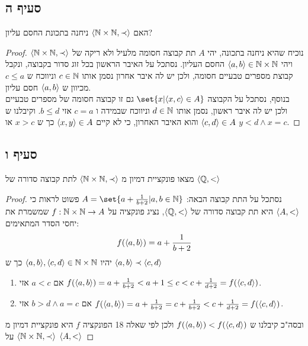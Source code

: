 \documentclass{article}
\DeclarePairedDelimiter\set\{\}
\begin{document}
	\subsection*{סעיף ה}
	האם $\langle \mathbb{N} \times \mathbb{N}, \prec \rangle$ ניחנה בתכונת החסם עליון?
	\begin{proof}
		נוכיח שהיא ניחנה בתכונה, יהי $A$ תת קבוצה חסומה מלעיל ולא ריקה של $\langle \mathbb{N} \times \mathbb{N}, \prec \rangle$
		ויהי $\langle a,b \rangle \in \mathbb{N} \times \mathbb{N}$ החסם העליון. נסתכל על האיבר הראשון בכל זוג סדור בקבוצה, ונקבל קבוצת מספרים טבעיים חסומה, ולכן יש לה איבר אחרון נסמן אותו $c \in \mathbb{N}$
		וניווכח ש $c \leq a$ מכיוון ש $\langle a,b \rangle$ חסם עליון. \\
		בנוסף, נסתכל על הקבוצה $\set{x | \ang{x,c} \in A}$ גם זו קבוצה חסומה של מספרים טבעיים ולכן יש לה איבר ראשון, נסמן אותו $d \in \mathbb{N}$
		וניווכח שבמידה ו $c=a$ אזי $b \leq d$.
		וקיבלנו ש $\langle c,d \rangle \in A$ והוא האיבר האחרון, כי לא קיים $\langle x,y \rangle \in A$ כך ש $x > c$ או $y < d \land x=c$.
	\end{proof}

	\subsection*{סעיף ו}
	מצאו פונקציית דמיון מ $\langle \mathbb{N} \times \mathbb{N}, \prec \rangle$ לתת קבוצה סדורה של $\langle \mathbb{Q}, < \rangle$
	\begin{proof}
		נסתכל על התת קבוצה הבאה: $A = \set{a + \frac{1}{b+2} | a,b \in \NN}$ פשוט לראות כי $\langle A, < \rangle$ היא תת קבוצה סדורה של $\langle \mathbb{Q}, < \rangle$,
		נציג פונקציה על $f: \mathbb{N} \times \mathbb{N} \rightarrow A$ שמשמרת את יחסי הסדר המתאימים:
		\[
		f(\langle a,b \rangle) = a + \frac{1}{b+2}
		\]
		יהיו $\langle a,b \rangle, \langle c,d \rangle \in \mathbb{N} \times \mathbb{N}$ כך ש $\langle a,b \rangle \prec \langle c,d \rangle$
		\begin{enumerate}
			\item אם $a < c$ אזי $f(\langle a, b \rangle) = a + \frac{1}{b+2} < a + 1 \leq c < c + \frac{1}{d+2} = f(\langle c,d \rangle)$.
			\item אם $b > d \land a=c$ אזי $f(\langle a,b \rangle) = a + \frac{1}{b+2} = c + \frac{1}{b+2} < c + \frac{1}{d+2} = f(\langle c,d \rangle)$.
		\end{enumerate}
		ובסה"כ קיבלנו ש $f(\langle a,b \rangle) < f(\langle c,d \rangle)$ ולכן לפי שאלה 18 הפונקציה $f$ היא פונקציית דמיון מ $\langle \mathbb{N} \times \mathbb{N}, \prec \rangle$ על $\langle A, < \rangle$
	\end{proof}

	\pagebreak
\end{document}
